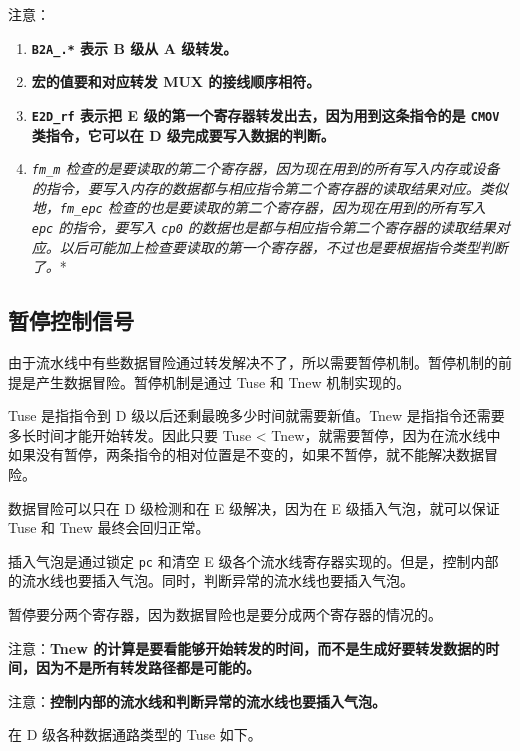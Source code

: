 \documentclass[12pt,AutoFakeBold,AutoFakeSlant]{article}
\providecommand{\tightlist}{%
  \setlength{\itemsep}{0pt}\setlength{\parskip}{0pt}}
\begin{document}
注意：

\begin{enumerate}
\def\labelenumi{\arabic{enumi}.}
\tightlist
\item
  \textbf{\texttt{B2A\_.*} 表示 B 级从 A 级转发。}
\item
  \textbf{宏的值要和对应转发 MUX 的接线顺序相符。}
\item
  \textbf{\texttt{E2D\_rf} 表示把 E
  级的第一个寄存器转发出去，因为用到这条指令的是 \texttt{CMOV}
  类指令，它可以在 D 级完成要写入数据的判断。}
\item
  \emph{\texttt{fm\_m}
  检查的是要读取的第二个寄存器，因为现在用到的所有写入内存或设备的指令，要写入内存的数据都与相应指令第二个寄存器的读取结果对应。类似地，\texttt{fm\_epc}
  检查的也是要读取的第二个寄存器，因为现在用到的所有写入 \texttt{epc}
  的指令，要写入 \texttt{cp0}
  的数据也是都与相应指令第二个寄存器的读取结果对应。以后可能加上检查要读取的第一个寄存器，不过也是要根据指令类型判断了。}*
\end{enumerate}

\hypertarget{ux6682ux505cux63a7ux5236ux4fe1ux53f7}{%
\subsection{暂停控制信号}\label{ux6682ux505cux63a7ux5236ux4fe1ux53f7}}

由于流水线中有些数据冒险通过转发解决不了，所以需要暂停机制。暂停机制的前提是产生数据冒险。暂停机制是通过
Tuse 和 Tnew 机制实现的。

Tuse 是指指令到 D 级以后还剩最晚多少时间就需要新值。Tnew
是指指令还需要多长时间才能开始转发。因此只要 Tuse \textless{}
Tnew，就需要暂停，因为在流水线中如果没有暂停，两条指令的相对位置是不变的，如果不暂停，就不能解决数据冒险。

数据冒险可以只在 D 级检测和在 E 级解决，因为在 E 级插入气泡，就可以保证
Tuse 和 Tnew 最终会回归正常。

插入气泡是通过锁定 \texttt{pc} 和清空 E
级各个流水线寄存器实现的。但是，控制内部的流水线也要插入气泡。同时，判断异常的流水线也要插入气泡。

暂停要分两个寄存器，因为数据冒险也是要分成两个寄存器的情况的。

注意：\textbf{Tnew
的计算是要看能够开始转发的时间，而不是生成好要转发数据的时间，因为不是所有转发路径都是可能的。}

注意：\textbf{控制内部的流水线和判断异常的流水线也要插入气泡。}

在 D 级各种数据通路类型的 Tuse 如下。
\end{document}
